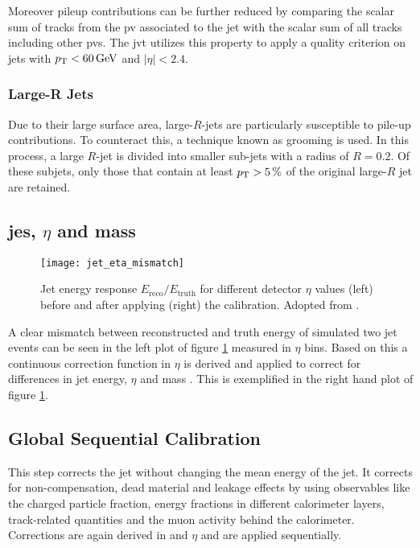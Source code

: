 Moreover pileup contributions can be further reduced by comparing the scalar \pt sum of tracks from the \ac{pv} associated to the jet with the scalar \pt sum of all tracks including other \acp{pv}. The \ac{jvt} \citep{ATLAS-CONF-2014-018} utilizes this property to apply a quality criterion on jets with $p_{\text{T}}<\qty[]{60}{GeV}$ and $|\eta|<2.4$.


\subsubsection{Large-R Jets}
Due to their large surface area, large-$R$-jets are particularly susceptible to pile-up contributions. To counteract this, a technique known as grooming is used. In this process, a large $R$-jet is divided into smaller sub-jets with a radius of $R=0.2$. Of these subjets, only those that contain at least $p_{\text{T}}>\qty[]{5}{\percent}$ of the original large-$R$ jet are retained.

\subsection{\ac{jes}, $\eta$ and mass}
\begin{figure}
  \centering
  \texttt{[image: jet\_eta\_mismatch]}
  \caption[]{Jet energy response $E_\text{reco}/E_\text{truth}$ for different detector $\eta$ values (left) before and after applying (right) the calibration. Adopted from \citep{jet_eta_calib}.}
  \label{fig:jet_eta_mismatch}
\end{figure}
A clear mismatch between reconstructed and truth energy of simulated two jet events can be seen in the left plot of figure \ref{fig:jet_eta_mismatch} measured in $\eta$ bins. Based on this a continuous correction function in $\eta$ is derived and applied to correct for differences in jet energy, $\eta$ and mass \citep{atlas2011jet,Aaboud:2019aa}. This is exemplified in the right hand plot of figure \ref{fig:jet_eta_mismatch}.

\subsection{Global Sequential Calibration}
This step corrects the jet \pt without changing the mean energy of the jet. It corrects for non-compensation, dead material and leakage effects by using observables like the charged particle fraction, energy fractions in different calorimeter layers, track-related quantities and the muon activity behind the calorimeter. Corrections are again derived in \pt and $\eta$ and are applied sequentially.

